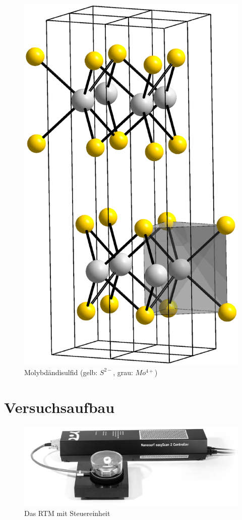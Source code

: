 \documentclass[12pt]{article}
\begin{document}
\begin{figure}[H]
\centering
\includegraphics[width=0.6\linewidth]{pictures/mos2.eps}
\caption{Molybdändisulfid (gelb: $S^{2-}$, grau: $Mo^{4+}$)}
\end{figure}

\section{Versuchsaufbau}
\begin{figure}[H]
\centering
\includegraphics[width=0.9\linewidth]{pictures/aufbau.eps}
\caption{Das RTM mit Steuereinheit}
\end{figure}
\end{document}
